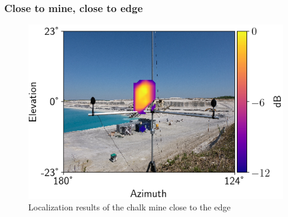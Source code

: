 \subsubsection{Close to mine, close to edge}
\begin{figure}[H]
    \centering
    \includegraphics[width=1\textwidth]{Figures/ChalkClose.png}
    \caption{Localization results of the chalk mine close to the edge}
    \label{fig:ChalkCLose}
\end{figure}

